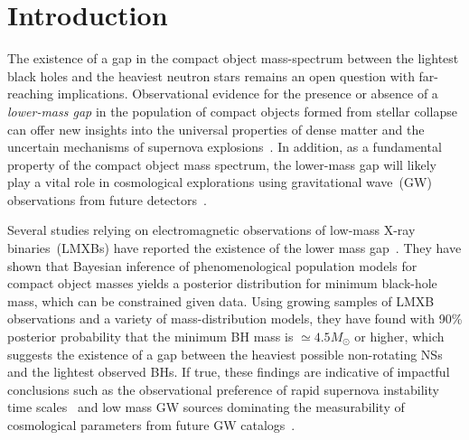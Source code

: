 \documentclass[modern]{aastex631}
\begin{document}
\section{Introduction}
\label{sec:intro}

The existence of a gap in the compact object mass-spectrum between the lightest black holes and the heaviest neutron stars remains an open question with far-reaching implications. Observational evidence for the presence or absence of a \textit{lower-mass gap} in the population of compact objects formed from stellar collapse can offer new insights into the universal properties of dense matter and the uncertain mechanisms of supernova explosions~\citep{Fryer:1999ht, Fryer:2011cx, Mandel:2020qwb, Zevin:2020gma, Liu:2020uba, Patton:2021gwh, Siegel:2022gwc}. In addition, as a fundamental property of the compact object mass spectrum, the lower-mass gap will likely play a vital role in cosmological explorations using gravitational wave~(GW) observations from future detectors~\citep{Ezquiaga:2022zkx}.

Several studies relying on electromagnetic observations of low-mass X-ray binaries~(LMXBs) have reported the existence of the lower mass gap~\citep{Bailyn:1997xt, Ozel:2010su, Farr:2010tu}. They have shown that Bayesian inference of phenomenological population models for compact object masses yields a posterior distribution for minimum black-hole mass, which can be constrained given data. Using growing samples of LMXB observations and a variety of mass-distribution models, they have found with 90\% posterior probability that the minimum BH mass is $\simeq 4.5M_{\odot}$ or higher, which suggests the existence of a gap between the heaviest possible non-rotating NSs~\citep[$2-3M_{\odot}$,][]{PhysRevLett.32.324, Kalogera:1996ci, Mueller:1996pm, Ozel:2016oaf, Margalit_2017, Ai:2019rre, Shao:2020bzt, Raaijmakers:2021uju} and the lightest observed BHs. If true, these findings are indicative of impactful conclusions such as the observational preference of rapid supernova instability time scales~\citep[$\sim 10 ms$,][]{Fryer:2011cx, Belczynski:2011bn, Fryer:2022lla, Siegel:2022gwc} and low mass GW sources dominating the measurability of cosmological parameters from future GW catalogs~\citep{Ezquiaga:2022zkx}.
\end{document}
